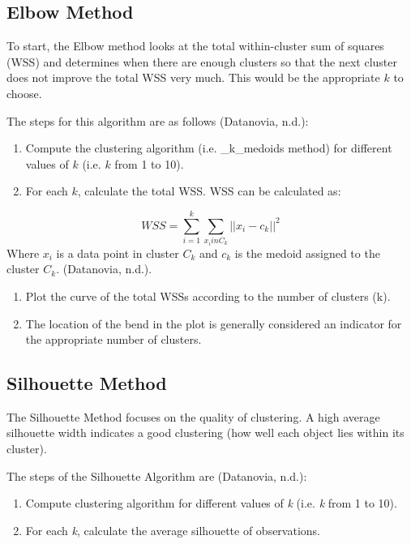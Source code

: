 \documentclass[12pt,twoside]{amherstthesis}
\begin{document}
  \subsection{Elbow Method}\label{elbow-method}
  
  To start, the Elbow method looks at the total within-cluster sum of
  squares (WSS) and determines when there are enough clusters so that the
  next cluster does not improve the total WSS very much. This would be the
  appropriate \(k\) to choose.
  
  The steps for this algorithm are as follows (Datanovia, n.d.):
  
  \begin{enumerate}
  \def\labelenumi{\arabic{enumi}.}
  \item
    Compute the clustering algorithm (i.e. \_k\_medoids method) for
    different values of \(k\) (i.e. \(k\) from 1 to 10).
  \item
    For each \(k\), calculate the total WSS. WSS can be calculated as:
  \end{enumerate}
  
  \[WSS= \sum_{i=1}^k \sum_{x_i in C_k} ||{{x_i- c_k}}||^2\] Where \(x_i\)
  is a data point in cluster \(C_k\) and \(c_k\) is the medoid assigned to
  the cluster \(C_k\). (Datanovia, n.d.).
  
  \begin{enumerate}
  \def\labelenumi{\arabic{enumi}.}
  \setcounter{enumi}{2}
  \item
    Plot the curve of the total WSSs according to the number of clusters
    (k).
  \item
    The location of the bend in the plot is generally considered an
    indicator for the appropriate number of clusters.
  \end{enumerate}
  
  \subsection{Silhouette Method}\label{silhouette-method}
  
  The Silhouette Method focuses on the quality of clustering. A high
  average silhouette width indicates a good clustering (how well each
  object lies within its cluster).
  
  The steps of the Silhouette Algorithm are (Datanovia, n.d.):
  
  \begin{enumerate}
  \def\labelenumi{\arabic{enumi}.}
  \item
    Compute clustering algorithm for different values of \emph{k} (i.e.
    \emph{k} from 1 to 10).
  \item
    For each \emph{k}, calculate the average silhouette of observations.
  \end{enumerate}
  
\end{document}
